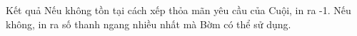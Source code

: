 Kết quả
Nếu không tồn tại cách xếp thỏa mãn yêu cầu của Cuội, in ra -1. Nếu không, in ra số thanh ngang nhiều nhất mà Bờm có thể sử dụng.